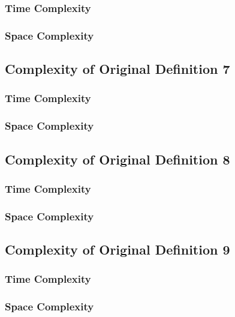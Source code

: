 \documentclass[conference]{IEEEtran}
\begin{document}
\subsubsection{Time Complexity}

\subsubsection{Space Complexity}

\subsection{Complexity of Original Definition 7}

\subsubsection{Time Complexity}

\subsubsection{Space Complexity}

\subsection{Complexity of Original Definition 8}

\subsubsection{Time Complexity}

\subsubsection{Space Complexity}

\subsection{Complexity of Original Definition 9}

\subsubsection{Time Complexity}

\subsubsection{Space Complexity}
\end{document}
